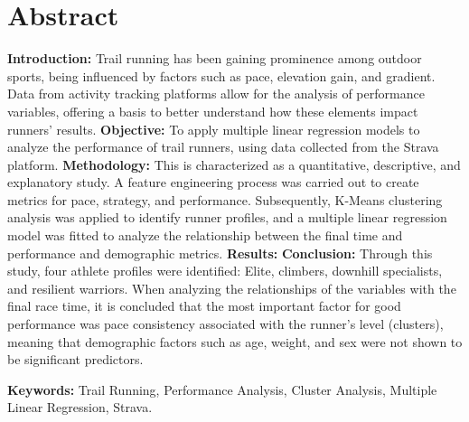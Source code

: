\chapter*{Abstract}
\thispagestyle{empty}
\label{chap:abstract}

\textbf{Introduction:} Trail running has been gaining prominence among outdoor sports, being influenced by factors such as pace, elevation gain, and gradient. Data from activity tracking platforms allow for the analysis of performance variables, offering a basis to better understand how these elements impact runners' results.
\textbf{Objective:} To apply multiple linear regression models to analyze the performance of trail runners, using data collected from the Strava platform.
\textbf{Methodology:} This is characterized as a quantitative, descriptive, and explanatory study. A feature engineering process was carried out to create metrics for pace, strategy, and performance. Subsequently, K-Means clustering analysis was applied to identify runner profiles, and a multiple linear regression model was fitted to analyze the relationship between the final time and performance and demographic metrics.
\textbf{Results:}
\textbf{Conclusion:} Through this study, four athlete profiles were identified: Elite, climbers, downhill specialists, and resilient warriors. When analyzing the relationships of the variables with the final race time, it is concluded that the most important factor for good performance was pace consistency associated with the runner's level (clusters), meaning that demographic factors such as age, weight, and sex were not shown to be significant predictors. 

\vspace{0.5\baselineskip}
\textbf{Keywords:} Trail Running, Performance Analysis, Cluster Analysis, Multiple Linear Regression, Strava.
